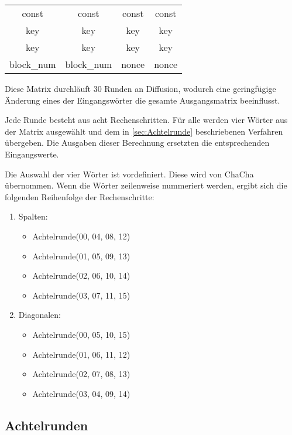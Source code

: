 \documentclass[10pt,a4paper]{article}
\begin{document}
\begin{center}
    \begin{tabular}{ c c c c }
        const      & const      & const & const \\
        key        & key        & key   & key   \\
        key        & key        & key   & key   \\
        block\_num & block\_num & nonce & nonce \\
    \end{tabular}
\end{center}

Diese Matrix durchläuft 30 Runden an Diffusion, wodurch eine geringfügige Änderung eines der Eingangswörter die gesamte Ausgangsmatrix beeinflusst.

\medskip
Jede Runde besteht aus acht Rechenschritten.
Für alle werden vier Wörter aus der Matrix ausgewählt und dem in \autoref{sec:Achtelrunde} beschriebenen Verfahren übergeben.
Die Ausgaben dieser Berechnung ersetzten die entsprechenden Eingangswerte.

Die Auswahl der vier Wörter ist vordefiniert.
Diese wird von ChaCha übernommen\cite{Bernstein2008}.
Wenn die Wörter zeilenweise nummeriert werden, ergibt sich die folgenden Reihenfolge der Rechenschritte:
\begin{enumerate}
    \item Spalten:
          \begin{itemize}
              \item Achtelrunde(00, 04, 08, 12)
              \item Achtelrunde(01, 05, 09, 13)
              \item Achtelrunde(02, 06, 10, 14)
              \item Achtelrunde(03, 07, 11, 15)
          \end{itemize}
    \item Diagonalen:
          \begin{itemize}
              \item Achtelrunde(00, 05, 10, 15)
              \item Achtelrunde(01, 06, 11, 12)
              \item Achtelrunde(02, 07, 08, 13)
              \item Achtelrunde(03, 04, 09, 14)
          \end{itemize}
\end{enumerate}

\subsection{Achtelrunden}
\label{sec:Achtelrunde}
\end{document}
